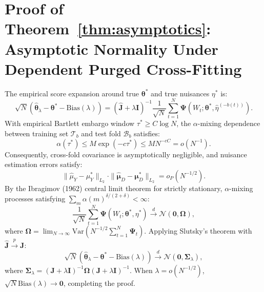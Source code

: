 \documentclass[twoside]{article}
\theoremstyle{definition}
\newcommand{\Var}{\mathrm{Var}}
\begin{document}
\section{Proof of Theorem~\ref{thm:asymptotics}: Asymptotic Normality Under Dependent Purged Cross-Fitting}
\label{app:proof_thm5}
The empirical score expansion around true $\boldsymbol{\theta}^*$ and true nuisances $\eta^*$ is:
\begin{equation}
    \sqrt{N}\left( \hat{\boldsymbol{\theta}}_\lambda - \boldsymbol{\theta}^* - \mathrm{Bias}(\lambda) \right) = (\hat{\boldsymbol{J}} + \lambda \boldsymbol{I})^{-1} \frac{1}{\sqrt{N}}\sum_{t=1}^N \boldsymbol{\Psi}(W_t; \boldsymbol{\theta}^*, \hat{\eta}^{(-b(t))}).
\end{equation}
With empirical Bartlett embargo window $\tau^* \ge C \log N$, the $\alpha$-mixing dependence between training set $\mathcal{T}_b$ and test fold $\mathcal{B}_b$ satisfies:
\begin{equation}
    \alpha(\tau^*) \le M \exp(-c \tau^*) \le M N^{-c C} = o(N^{-1}).
\end{equation}
Consequently, cross-fold covariance is asymptotically negligible, and nuisance estimation errors satisfy:
\begin{equation}
    \|\hat{\mu}_Y - \mu_Y^*\|_{L_2} \cdot \|\hat{\boldsymbol{\mu}}_D - \boldsymbol{\mu}_D^*\|_{L_2} = o_P(N^{-1/2}).
\end{equation}
By the Ibragimov (1962) central limit theorem for strictly stationary, $\alpha$-mixing processes satisfying $\sum_m \alpha(m)^{\delta/(2+\delta)} < \infty$:
\begin{equation}
    \frac{1}{\sqrt{N}} \sum_{t=1}^N \boldsymbol{\Psi}(W_t; \boldsymbol{\theta}^*, \eta^*) \xrightarrow{d} \mathcal{N}\left(\mathbf{0}, \boldsymbol{\Omega}\right),
\end{equation}
where $\boldsymbol{\Omega} = \lim_{N \to \infty} \Var\left( N^{-1/2} \sum_{t=1}^N \boldsymbol{\Psi}_t \right)$.
Applying Slutsky's theorem with $\hat{\boldsymbol{J}} \xrightarrow{p} \boldsymbol{J}$:
\begin{equation}
    \sqrt{N}\left( \hat{\boldsymbol{\theta}}_\lambda - \boldsymbol{\theta}^* - \mathrm{Bias}(\lambda) \right) \xrightarrow{d} \mathcal{N}\left(\mathbf{0}, \boldsymbol{\Sigma}_\lambda\right),
\end{equation}
where $\boldsymbol{\Sigma}_\lambda = (\boldsymbol{J} + \lambda \boldsymbol{I})^{-1} \boldsymbol{\Omega} (\boldsymbol{J} + \lambda \boldsymbol{I})^{-1}$. When $\lambda = o(N^{-1/2})$, $\sqrt{N}\mathrm{Bias}(\lambda) \to \mathbf{0}$, completing the proof.
\end{document}
